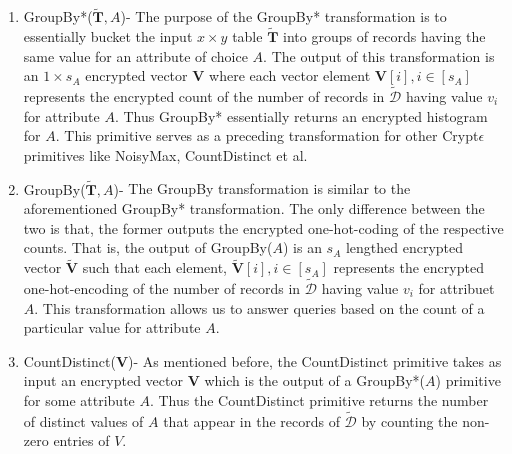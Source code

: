 {\begin{enumerate}
    \item{\textsf{GroupBy*}($\mathbf{\tilde{T}},A$)}- The purpose of the \textsf{GroupBy*} transformation is to essentially bucket the input $x\times y$ table $\mathbf{\tilde{T}}$ into groups of records having the same value for an attribute of choice $A$. The output of this transformation is an $1\times s_A$ encrypted  vector $\mathbf{V}$  where each vector element $\mathbf{V}[i], i \in [s_A]$ represents the encrypted count of the number of records in $\boldsymbol{\tilde{\mathcal{D}}}$ having value $v_{i}$ for attribute $A$. Thus \textsf{GroupBy*} essentially returns an encrypted histogram for $A$.
    This primitive serves as a preceding transformation for other Crypt$\epsilon$ primitives like \textsf{NoisyMax}, \textsf{CountDistinct} et al.
     \item{\textsf{GroupBy}($\mathbf{\tilde{T}},A$)-} The \textsf{GroupBy} transformation is similar to the aforementioned \textsf{GroupBy*} transformation. The only difference between the two is that, the former outputs the encrypted one-hot-coding of the respective counts. That is, the output of \textsf{GroupBy}($A$)  is an $s_A$ lengthed encrypted vector $\tilde{\mathbf{V}}$ such that each element, $\tilde{\mathbf{V}}[i], i \in [s_A]$ represents the encrypted one-hot-encoding of the number of records in $\boldsymbol{\tilde{\mathcal{D}}}$ having value $v_{i}$ for attribuet $A$. This transformation allows us to answer queries based on the count of a particular value for attribute $A$.
     \item {\textsf{CountDistinct}($\mathbf{V}$)-} As mentioned before, the \textsf{CountDistinct} primitive takes as input an encrypted vector $\mathbf{V}$ which is the output of a \textsf{GroupBy*}($A$) primitive for some attribute $A$. Thus the \textsf{CountDistinct} primitive  returns the number of distinct values of $A$ that appear in the records of $\boldsymbol{\tilde{\mathcal{D}}}$ by counting the non-zero entries of $V$.  
\end{enumerate}

}


